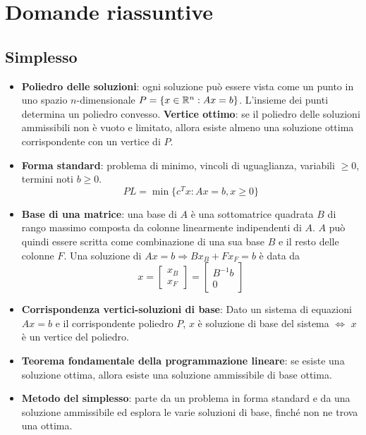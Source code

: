 
\chapter{Domande riassuntive}

\section{Simplesso}

\begin{itemize}
	\item \textbf{Poliedro delle soluzioni}: ogni soluzione può essere vista come un punto in uno spazio $n$-dimensionale $P = \{x \in \mathbb{R}^n : Ax = b \}$. L'insieme dei punti determina un poliedro convesso. \textbf{Vertice ottimo}: se il poliedro delle soluzioni ammissibili non è vuoto e limitato, allora esiste almeno una soluzione ottima corrispondente con un vertice di $P$.
	\item \textbf{Forma standard}: problema di minimo, vincoli di uguaglianza, variabili $\geq 0$, termini noti $b \geq 0$.
	$$
	PL =  \min\{ c^T x: Ax=b, x\geq 0\}
	$$
	\item \textbf{Base di una matrice}: una base di $A$ è una sottomatrice quadrata $B$ di rango massimo composta da colonne linearmente indipendenti di $A$. $A$ può quindi essere scritta come combinazione di una sua base $B$ e il resto delle colonne $F$.
	Una soluzione di $Ax = b \Rightarrow Bx_B + Fx_F = b$ è data da
	$$
	x = \begin{bmatrix}
	x_B \\
	x_F
	\end{bmatrix} = \begin{bmatrix}
	B^{-1}b \\
	0
	\end{bmatrix}
	$$
	\item \textbf{Corrispondenza vertici-soluzioni di base}: Dato un sistema di equazioni $Ax = b$ e il corrispondente poliedro $P$, $x$ è soluzione di base del sistema $\Leftrightarrow$ $x$ è un vertice del poliedro.
	\item \textbf{Teorema fondamentale della programmazione lineare}: se esiste una soluzione ottima, allora esiste una soluzione ammissibile di base ottima.
	\item \textbf{Metodo del simplesso}: parte da un problema in forma standard e da una soluzione ammissibile ed esplora le varie soluzioni di base, finché non ne trova una ottima.

\end{itemize}
